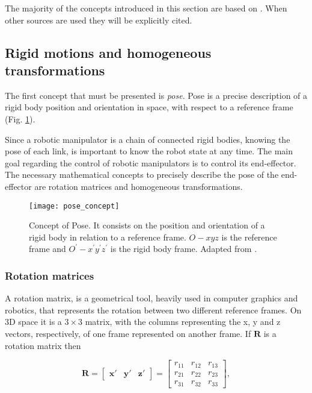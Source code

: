 The majority of the concepts introduced in this section are based on \cite{Siciliano2009_robotics_modelling_planning_control}. When other sources are used they will be explicitly cited.

\subsection{Rigid motions and homogeneous transformations}
\label{subsec:rigid_motions_homogeneous_transformations}

The first concept that must be presented is \emph{pose}. Pose is a precise description of a rigid body position and orientation in space, with respect to a reference frame (Fig. \ref{fig:pose_concept}).  

Since a robotic manipulator is a chain of connected rigid bodies, knowing the pose of each link, is important to know the robot state at any time. The main goal regarding the control of robotic manipulators is to control its end-effector. The necessary mathematical concepts to precisely describe the pose of the end-effector are rotation matrices and homogeneous transformations.

\begin{figure}[htbp]
	\centering
	\texttt{[image: pose\_concept]}
	\caption[Concept of Pose.]{Concept of Pose. It consists on the position and orientation of a rigid body in relation to a reference frame. $O-xyz$ is the reference frame and $O^\prime-x^\prime y^\prime z^\prime$ is the rigid body frame. Adapted from \cite{Siciliano2009_robotics_modelling_planning_control}.}
	\label{fig:pose_concept}
\end{figure}

\subsubsection{Rotation matrices}
\label{subsubsec:rotation_matrices}

A rotation matrix, is a geometrical tool, heavily used in computer graphics and robotics, that represents the rotation between two different reference frames. On 3D space it is a $3\times3$ matrix, with the columns representing the x, y and z vectors, respectively, of one frame represented on another frame. If $\boldsymbol{R}$ is a rotation matrix then

\begin{equation}
    \boldsymbol{R} = \begin{bmatrix} \boldsymbol{x'} & \boldsymbol{y'} & \boldsymbol{z'}\end{bmatrix} = \begin{bmatrix} r_{11} & r_{12} & r_{13}\\
    r_{21} & r_{22} & r_{23}\\
    r_{31} & r_{32} & r_{33}\end{bmatrix},
\end{equation}

